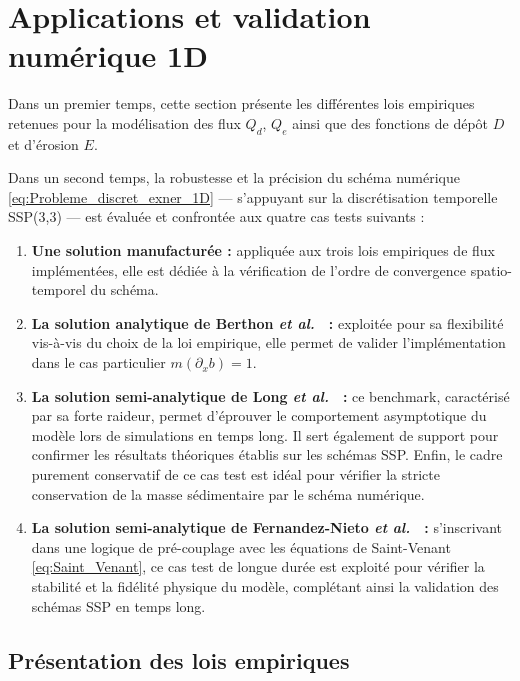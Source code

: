 \documentclass[11pt, a4paper, oneside]{report}
\begin{document}
\section{Applications et validation numérique 1D}

Dans un premier temps, cette section présente les différentes lois empiriques retenues pour la modélisation des flux $Q_d$, $Q_e$ ainsi que des fonctions de dépôt $D$ et d'érosion $E$.

Dans un second temps, la robustesse et la précision du schéma numérique \eqref{eq:Probleme_discret_exner_1D} — s'appuyant sur la discrétisation temporelle SSP(3,3) — est évaluée et confrontée aux quatre cas tests suivants :
\begin{enumerate}
    \item \textbf{Une solution manufacturée :} appliquée aux trois lois empiriques de flux implémentées, elle est dédiée à la vérification de l'ordre de convergence spatio-temporel du schéma.
    \item \textbf{La solution analytique de Berthon \textit{et al.}}~\cite{berthon2012analytical}~\textbf{:} exploitée pour sa flexibilité vis-à-vis du choix de la loi empirique, elle permet de valider l'implémentation dans le cas particulier $m(\partial_x b) = 1$.
    \item \textbf{La solution semi-analytique de Long \textit{et al.}}~\cite{long2008numerical}~\textbf{:} ce benchmark, caractérisé par sa forte raideur, permet d'éprouver le comportement asymptotique du modèle lors de simulations en temps long. Il sert également de support pour confirmer les résultats théoriques établis sur les schémas SSP. Enfin, le cadre purement conservatif de ce cas test est idéal pour vérifier la stricte conservation de la masse sédimentaire par le schéma numérique.
    \item \textbf{La solution semi-analytique de Fernandez-Nieto \textit{et al.}}~\cite{fernandez2025third}~\textbf{:} s'inscrivant dans une logique de pré-couplage avec les équations de Saint-Venant \eqref{eq:Saint_Venant}, ce cas test de longue durée est exploité pour vérifier la stabilité et la fidélité physique du modèle, complétant ainsi la validation des schémas SSP en temps long.
\end{enumerate}

\subsection{Présentation des lois empiriques}
\end{document}
